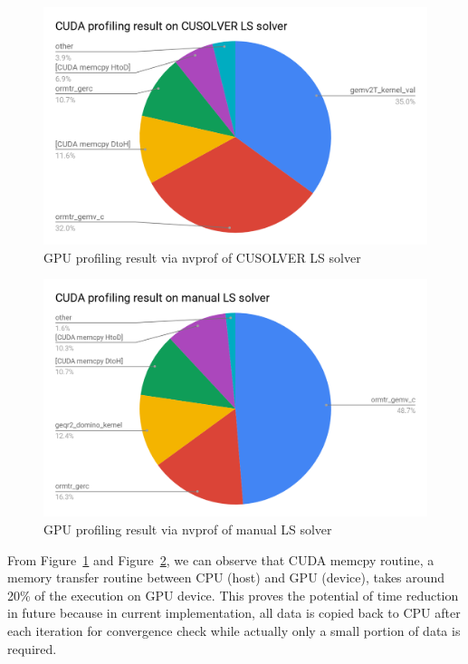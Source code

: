 \documentclass[English]{dicomopapers}
\begin{document}
\begin{figure}[ht]
  \vspace*{-2cm}
  \centering
  \includegraphics[width=\columnwidth,natwidth=1200,natheight=742]{nvprof_qr.png}
  \caption{GPU profiling result via nvprof of CUSOLVER LS solver}\label{fig:nvprof_qr}
\end{figure}

\begin{figure}[ht]
  \vspace*{-2cm}
  \centering
  \includegraphics[width=\columnwidth,natwidth=1200,natheight=742]{nvprof_manual.png}
  \caption{GPU profiling result via nvprof of manual LS solver}\label{fig:nvprof_manual}
\end{figure}
From Figure~\ref{fig:nvprof_qr} and Figure~\ref{fig:nvprof_manual}, we can observe that CUDA memcpy routine, a memory transfer routine between CPU (host) and GPU (device), takes around 20\% of the execution on GPU device. This proves the potential of time reduction in future because in current implementation, all data is copied back to CPU after each iteration for convergence check while actually only a small portion of data is required.\newline
\end{document}
